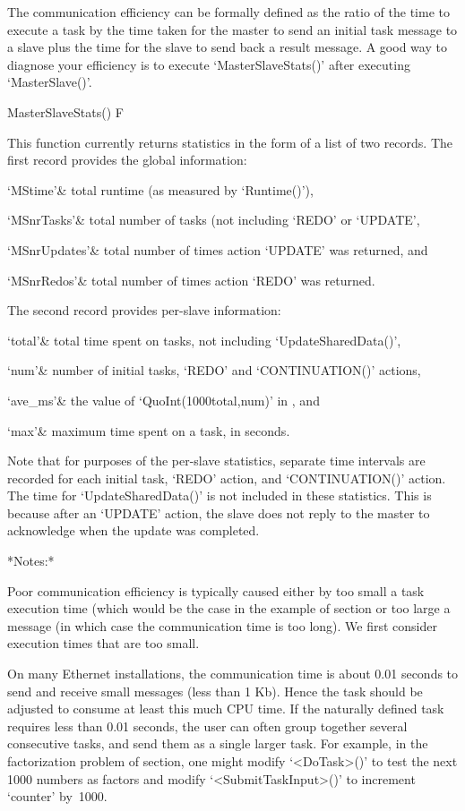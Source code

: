 The communication efficiency can be formally defined as the ratio of  the
time to execute a task by the time  taken  for  the  master  to  send  an
initial task message to a slave plus the time for the slave to send  back
a result message. A good way to diagnose your efficiency  is  to  execute
`MasterSlaveStats()' after executing `MasterSlave()'.

\>MasterSlaveStats() F

This function currently returns statistics in the form of a list  of  two
records. The first record provides the global information:

\beginitems

`MStime'&
    total runtime (as measured by `Runtime()'),

`MSnrTasks'&
    total number of tasks (not including `REDO' or `UPDATE',

`MSnrUpdates'&
    total number of times action `UPDATE' was returned, and

`MSnrRedos'&
    total number of times action `REDO' was returned.

\enditems

The second record provides per-slave information:

\beginitems

`total'&
    total time spent on tasks, not including `UpdateSharedData()',

`num'&
    number of initial tasks, `REDO' and `CONTINUATION()' actions,

`ave_ms'& 
    the value of `QuoInt(1000\*total,num)' in {\GAP}, and

`max'&
    maximum time spent on a task, in seconds.

\enditems

Note that  for  purposes  of  the  per-slave  statistics,  separate  time
intervals  are  recorded  for  each  initial  task,  `REDO'  action,  and
`CONTINUATION()'  action.  The  time  for  `UpdateSharedData()'  is  not
included in these statistics. This is because after an  `UPDATE'  action,
the slave does not reply to the master to acknowledge when the update was
completed.

*Notes:*

Poor communication efficiency is typically caused either by too  small  a
task execution time (which would be the case in the example of section or
too large a message (in which case the communication time is  too  long).
We first consider execution times that are too small.

On many Ethernet installations, the  communication  time  is  about  0.01
seconds to send and receive small messages (less than 1  Kb).  Hence  the
task should be adjusted to consume at least this much CPU  time.  If  the
naturally defined task requires less than  0.01  seconds,  the  user  can
often group together several consecutive tasks, and send them as a single
larger task. For example, in the factorization problem  of  section,  one
might modify `<DoTask>()' to test the next 1000 numbers  as  factors  and
modify `<SubmitTaskInput>()' to increment `counter' by~1000.


